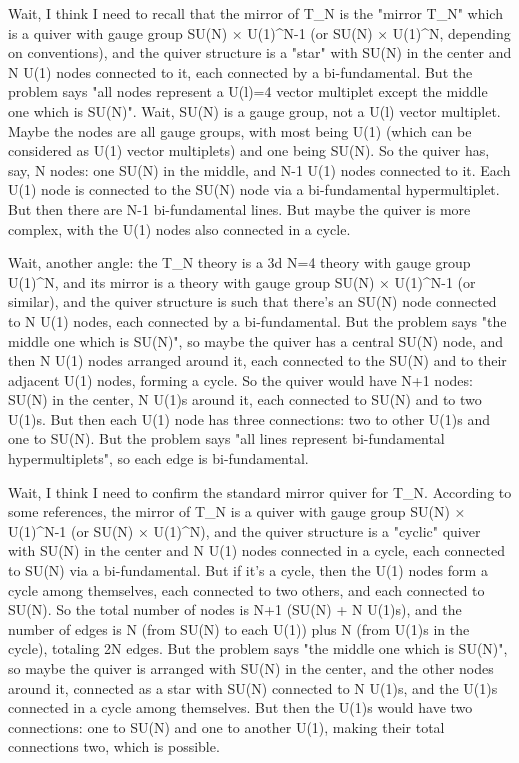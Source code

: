 Wait, I think I need to recall that the mirror of T_N is the "mirror T_N" which is a quiver with gauge group SU(N) × U(1)^{N-1} (or SU(N) × U(1)^N, depending on conventions), and the quiver structure is a "star" with SU(N) in the center and N U(1) nodes connected to it, each connected by a bi-fundamental. But the problem says "all nodes represent a U(l)=4 vector multiplet except the middle one which is SU(N)". Wait, SU(N) is a gauge group, not a U(l) vector multiplet. Maybe the nodes are all gauge groups, with most being U(1) (which can be considered as U(1) vector multiplets) and one being SU(N). So the quiver has, say, N nodes: one SU(N) in the middle, and N-1 U(1) nodes connected to it. Each U(1) node is connected to the SU(N) node via a bi-fundamental hypermultiplet. But then there are N-1 bi-fundamental lines. But maybe the quiver is more complex, with the U(1) nodes also connected in a cycle. 

Wait, another angle: the T_N theory is a 3d N=4 theory with gauge group U(1)^N, and its mirror is a theory with gauge group SU(N) × U(1)^{N-1} (or similar), and the quiver structure is such that there's an SU(N) node connected to N U(1) nodes, each connected by a bi-fundamental. But the problem says "the middle one which is SU(N)", so maybe the quiver has a central SU(N) node, and then N U(1) nodes arranged around it, each connected to the SU(N) and to their adjacent U(1) nodes, forming a cycle. So the quiver would have N+1 nodes: SU(N) in the center, N U(1)s around it, each connected to SU(N) and to two U(1)s. But then each U(1) node has three connections: two to other U(1)s and one to SU(N). But the problem says "all lines represent bi-fundamental hypermultiplets", so each edge is bi-fundamental. 

Wait, I think I need to confirm the standard mirror quiver for T_N. According to some references, the mirror of T_N is a quiver with gauge group SU(N) × U(1)^{N-1} (or SU(N) × U(1)^N), and the quiver structure is a "cyclic" quiver with SU(N) in the center and N U(1) nodes connected in a cycle, each connected to SU(N) via a bi-fundamental. But if it's a cycle, then the U(1) nodes form a cycle among themselves, each connected to two others, and each connected to SU(N). So the total number of nodes is N+1 (SU(N) + N U(1)s), and the number of edges is N (from SU(N) to each U(1)) plus N (from U(1)s in the cycle), totaling 2N edges. But the problem says "the middle one which is SU(N)", so maybe the quiver is arranged with SU(N) in the center, and the other nodes around it, connected as a star with SU(N) connected to N U(1)s, and the U(1)s connected in a cycle among themselves. But then the U(1)s would have two connections: one to SU(N) and one to another U(1), making their total connections two, which is possible. 


